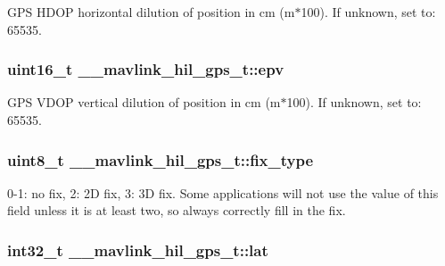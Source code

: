 G\+P\+S H\+D\+O\+P horizontal dilution of position in cm (m$\ast$100). If unknown, set to\+: 65535. 

\hypertarget{struct____mavlink__hil__gps__t_aaf9040cabae429efd2901d51ee3a4969}{
\subsubsection[{epv}]{\setlength{\rightskip}{0pt plus 5cm}uint16\+\_\+t \+\_\+\+\_\+mavlink\+\_\+hil\+\_\+gps\+\_\+t\+::epv}}\label{struct____mavlink__hil__gps__t_aaf9040cabae429efd2901d51ee3a4969}


G\+P\+S V\+D\+O\+P vertical dilution of position in cm (m$\ast$100). If unknown, set to\+: 65535. 

\hypertarget{struct____mavlink__hil__gps__t_ab823793fa4f3c3f56b1879faedc8776e}{
\subsubsection[{fix\+\_\+type}]{\setlength{\rightskip}{0pt plus 5cm}uint8\+\_\+t \+\_\+\+\_\+mavlink\+\_\+hil\+\_\+gps\+\_\+t\+::fix\+\_\+type}}\label{struct____mavlink__hil__gps__t_ab823793fa4f3c3f56b1879faedc8776e}


0-\/1\+: no fix, 2\+: 2\+D fix, 3\+: 3\+D fix. Some applications will not use the value of this field unless it is at least two, so always correctly fill in the fix. 

\hypertarget{struct____mavlink__hil__gps__t_a5adc957f66ccbd23fe9bfabd056c03c5}{
\subsubsection[{lat}]{\setlength{\rightskip}{0pt plus 5cm}int32\+\_\+t \+\_\+\+\_\+mavlink\+\_\+hil\+\_\+gps\+\_\+t\+::lat}}\label{struct____mavlink__hil__gps__t_a5adc957f66ccbd23fe9bfabd056c03c5}


